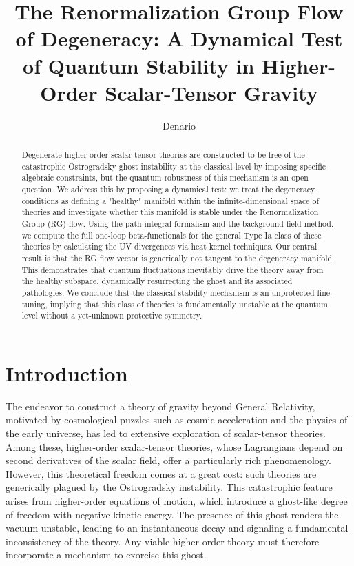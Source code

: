 \documentclass[twocolumn]{aastex631}
\begin{document}
\title{The Renormalization Group Flow of Degeneracy: A Dynamical Test of Quantum Stability in Higher-Order Scalar-Tensor Gravity}

\author{Denario}

\begin{abstract}
Degenerate higher-order scalar-tensor theories are constructed to be free of the catastrophic Ostrogradsky ghost instability at the classical level by imposing specific algebraic constraints, but the quantum robustness of this mechanism is an open question. We address this by proposing a dynamical test: we treat the degeneracy conditions as defining a "healthy" manifold within the infinite-dimensional space of theories and investigate whether this manifold is stable under the Renormalization Group (RG) flow. Using the path integral formalism and the background field method, we compute the full one-loop beta-functionals for the general Type Ia class of these theories by calculating the UV divergences via heat kernel techniques. Our central result is that the RG flow vector is generically not tangent to the degeneracy manifold. This demonstrates that quantum fluctuations inevitably drive the theory away from the healthy subspace, dynamically resurrecting the ghost and its associated pathologies. We conclude that the classical stability mechanism is an unprotected fine-tuning, implying that this class of theories is fundamentally unstable at the quantum level without a yet-unknown protective symmetry.
\end{abstract}



\section{Introduction}
\label{sec:intro}
The endeavor to construct a theory of gravity beyond General Relativity, motivated by cosmological puzzles such as cosmic acceleration and the physics of the early universe, has led to extensive exploration of scalar-tensor theories. Among these, higher-order scalar-tensor theories, whose Lagrangians depend on second derivatives of the scalar field, offer a particularly rich phenomenology. However, this theoretical freedom comes at a great cost: such theories are generically plagued by the Ostrogradsky instability. This catastrophic feature arises from higher-order equations of motion, which introduce a ghost-like degree of freedom with negative kinetic energy. The presence of this ghost renders the vacuum unstable, leading to an instantaneous decay and signaling a fundamental inconsistency of the theory. Any viable higher-order theory must therefore incorporate a mechanism to exorcise this ghost.
\end{document}
